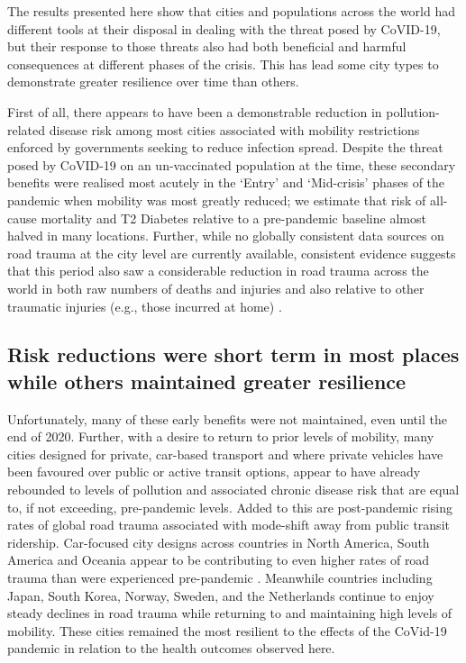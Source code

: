 \documentclass[preprint,10pt]{elsarticle} %
\begin{document}
The results presented here show that cities and populations across the world had different tools at their disposal in dealing with the threat posed by CoVID-19, but their response to those threats also had both beneficial and harmful consequences at different phases of the crisis. This has lead some city types to demonstrate greater resilience over time than others.

First of all, there appears to have been a demonstrable reduction in pollution-related disease risk among most cities associated with mobility restrictions enforced by governments seeking to reduce infection spread. Despite the threat posed by CoVID-19 on an un-vaccinated population at the time, these secondary benefits were realised most acutely in the `Entry' and `Mid-crisis' phases of the pandemic when mobility was most greatly reduced; we estimate that risk of all-cause mortality and T2 Diabetes relative to a pre-pandemic baseline almost halved in many locations. Further, while no globally consistent data sources on road trauma at the city level are currently available, consistent evidence suggests that this period also saw a considerable reduction in road trauma across the world in both raw numbers of deaths and injuries \cite{saladie2023back} and also relative to other traumatic injuries (e.g., those incurred at home) \cite{WASEEM2021200}.

\subsection*{Risk reductions were short term in most places while others maintained greater resilience}
Unfortunately, many of these early benefits were not maintained, even until the end of 2020. Further, with a desire to return to prior levels of mobility, many cities designed for private, car-based transport and where private vehicles have been favoured over public or active transit options\cite{DAS20211}, appear to have already rebounded to levels of pollution and associated chronic disease risk that are equal to, if not exceeding, pre-pandemic levels. Added to this are post-pandemic rising rates of global road trauma associated with mode-shift away from public transit ridership. Car-focused city designs across countries in North America, South America and Oceania appear to be contributing to even higher rates of road trauma than were experienced pre-pandemic \cite{ITFRS}. Meanwhile countries including Japan, South Korea, Norway, Sweden, and the Netherlands continue to enjoy steady declines in road trauma while returning to and maintaining high levels of mobility. These cities remained the most resilient to the effects of the CoVid-19 pandemic in relation to the health outcomes observed here.
\end{document}
